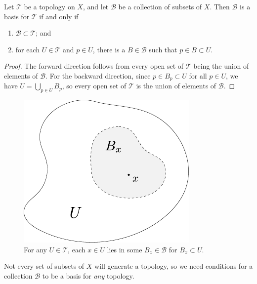 \documentclass[10pt]{report}
\begin{document}
\begin{prop}
\label{prop:basis-specific-top}
Let $\mathcal{T}$ be a topology on $X$, and let $\mathcal{B}$ be a collection of subsets of $X$. Then $\mathcal{B}$ is a basis for $\mathcal{T}$ if and only if
\begin{enumerate}
	\item $\mathcal{B}\subset \mathcal{T}$; and
	\item for each $U \in \mathcal{T}$ and $p \in U$, there is a $B \in \mathcal{B}$ such that $p \in B \subset U$.
\end{enumerate}
\end{prop}
\begin{proof}
	The forward direction follows from every open set of $\mathcal{T}$ being the union of elements of $\mathcal{B}$. For the backward direction, since $p \in B_p \subset U$ for all $p \in U$, we have $U = \bigcup_{p\in U}B_p$, so every open set of $\mathcal{T}$ is the union of elements of $\mathcal{B}$. 
\end{proof}

\begin{figure}[H]
	\centering
	\includegraphics[scale=0.8]{fig/gen-top.pdf}
	\caption{For any $U \in \mathcal{T}$, each $x \in U$ lies in some $B_x \in \mathcal{B}$ for $B_x \subset U$.}
\end{figure}


Not every set of subsets of $X$ will generate a topology, so we need conditions for a collection $\mathcal{B}$ to be a basis for \textit{any} topology.
\end{document}
